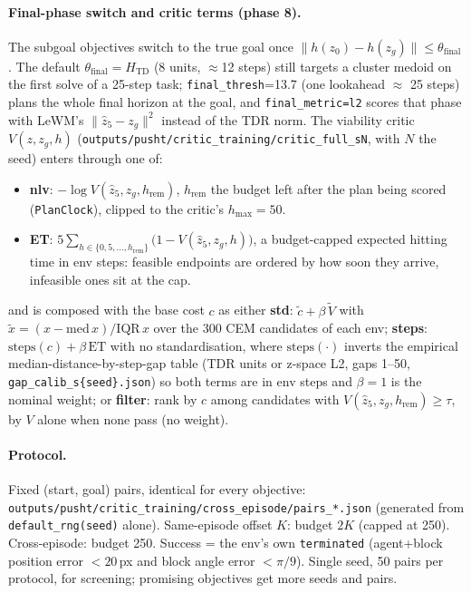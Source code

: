 \documentclass[11pt]{article}
\newcommand{\z}{z}
\newcommand{\Htd}{H_{\mathrm{TD}}}
\begin{document}
\paragraph{Final-phase switch and critic terms (phase 8).} The subgoal objectives switch
to the true goal once $\|h(\z_0)-h(\z_g)\|\le\theta_{\mathrm{final}}$. The default
$\theta_{\mathrm{final}}=\Htd$ (8 units, $\approx$12 steps) still targets a cluster medoid on
the first solve of a 25-step task; \texttt{final\_thresh}=13.7 (one lookahead $\approx$ 25
steps) plans the whole final horizon at the goal, and \texttt{final\_metric=l2} scores that
phase with LeWM's $\|\hat\z_5-\z_g\|^2$ instead of the TDR norm. The viability critic
$V(\z,\z_g,h)$ (\texttt{outputs/pusht/critic\_training/critic\_full\_sN}, with $N$ the seed) enters through one of:
\begin{itemize}[nosep]
  \item \textbf{nlv}: $-\log V(\hat\z_5,\z_g,h_{\mathrm{rem}})$, $h_{\mathrm{rem}}$ the budget
        left after the plan being scored (\texttt{PlanClock}), clipped to the critic's $h_{\max}=50$.
  \item \textbf{ET}: $5\sum_{h\in\{0,5,\dots,h_{\mathrm{rem}}\}}\big(1-V(\hat\z_5,\z_g,h)\big)$,
        a budget-capped expected hitting time in env steps: feasible endpoints are ordered by
        how soon they arrive, infeasible ones sit at the cap.
\end{itemize}
and is composed with the base cost $c$ as either \textbf{std}: $\tilde c+\beta\,\tilde V$ with
$\tilde x=(x-\mathrm{med}\,x)/\mathrm{IQR}\,x$ over the 300 CEM candidates of each env;
\textbf{steps}: $\mathrm{steps}(c)+\beta\,\mathrm{ET}$ with no standardisation, where
$\mathrm{steps}(\cdot)$ inverts the empirical median-distance-by-step-gap table (TDR units or
z-space L2, gaps 1--50, \texttt{gap\_calib\_s\{seed\}.json}) so both terms are in env steps
and $\beta=1$ is the nominal weight; or \textbf{filter}: rank by $c$ among candidates with
$V(\hat\z_5,\z_g,h_{\mathrm{rem}})\ge\tau$, by $V$ alone when none pass (no weight).

\paragraph{Protocol.} Fixed (start, goal) pairs, identical for every objective:
\texttt{outputs/pusht/critic\_training/cross\_episode/pairs\_*.json}
(generated from \texttt{default\_rng(seed)} alone). Same-episode offset $K$: budget $2K$
(capped at 250). Cross-episode: budget 250. Success = the env's own \texttt{terminated}
(agent+block position error $<20$\,px and block angle error $<\pi/9$). Single seed, 50
pairs per protocol, for screening; promising objectives get more seeds and pairs.
\end{document}
